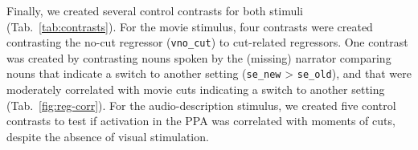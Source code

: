 \documentclass[english]{article}
\begin{document}
Finally, we created several control contrasts for both stimuli
(Tab.~\ref{tab:contrasts}).
For the movie stimulus, four contrasts were created contrasting the no-cut
regressor (\texttt{vno\_cut}) to cut-related regressors.
One contrast was created by contrasting nouns spoken by the (missing) narrator
comparing nouns
%
that indicate a switch to another setting (\texttt{se\_new} >
\texttt{se\_old}), and
%
that were moderately correlated with movie cuts indicating a
switch to another setting (Tab.~\ref{fig:reg-corr}).
For the audio-description stimulus, we created five control contrasts to test if
activation in the PPA was correlated with moments of cuts, despite the absence
of visual stimulation.

\end{document}
